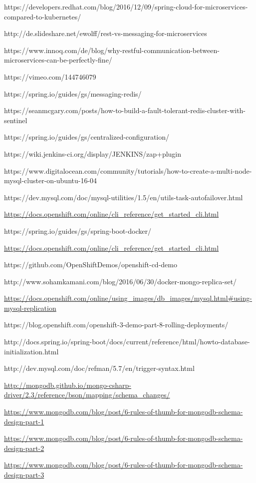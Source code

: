 https://developers.redhat.com/blog/2016/12/09/spring-cloud-for-microservices-compared-to-kubernetes/

http://de.slideshare.net/ewolff/rest-vs-messaging-for-microservices

https://www.innoq.com/de/blog/why-restful-communication-between-microservices-can-be-perfectly-fine/

https://vimeo.com/144746079

https://spring.io/guides/gs/messaging-redis/

https://seanmcgary.com/posts/how-to-build-a-fault-tolerant-redis-cluster-with-sentinel

https://spring.io/guides/gs/centralized-configuration/

https://wiki.jenkins-ci.org/display/JENKINS/zap+plugin

https://www.digitalocean.com/community/tutorials/how-to-create-a-multi-node-mysql-cluster-on-ubuntu-16-04

https://dev.mysql.com/doc/mysql-utilities/1.5/en/utils-task-autofailover.html

\url{https://docs.openshift.com/online/cli_reference/get_started_cli.html}

https://spring.io/guides/gs/spring-boot-docker/

\url{https://docs.openshift.com/online/cli_reference/get_started_cli.html}

https://github.com/OpenShiftDemos/openshift-cd-demo

http://www.sohamkamani.com/blog/2016/06/30/docker-mongo-replica-set/

\url{https://docs.openshift.com/online/using_images/db_images/mysql.html#using-mysql-replication}

https://blog.openshift.com/openshift-3-demo-part-8-rolling-deployments/

http://docs.spring.io/spring-boot/docs/current/reference/html/howto-database-initialization.html

http://dev.mysql.com/doc/refman/5.7/en/trigger-syntax.html

\url{http://mongodb.github.io/mongo-csharp-driver/2.3/reference/bson/mapping/schema_changes/}

\url{https://www.mongodb.com/blog/post/6-rules-of-thumb-for-mongodb-schema-design-part-1}

\url{https://www.mongodb.com/blog/post/6-rules-of-thumb-for-mongodb-schema-design-part-2}

\url{https://www.mongodb.com/blog/post/6-rules-of-thumb-for-mongodb-schema-design-part-3}